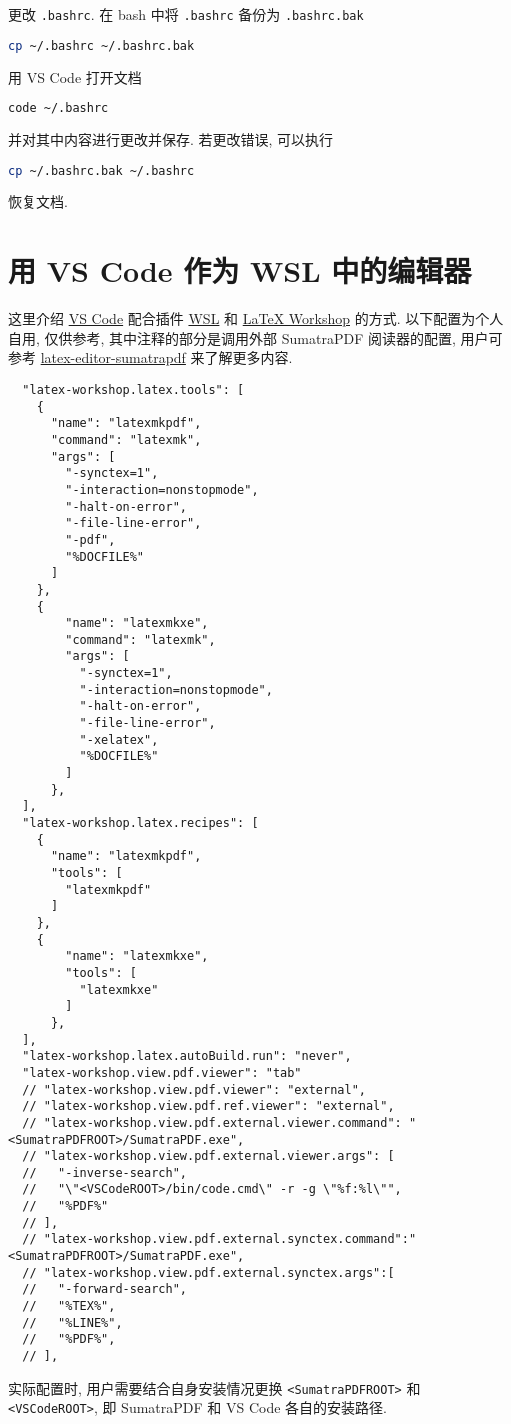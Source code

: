 更改 \texttt{.bashrc}.
在 \textsf{bash} 中将 \texttt{.bashrc} 备份为 \texttt{.bashrc.bak}
\begin{lstlisting}[language=bash]
  cp ~/.bashrc ~/.bashrc.bak
\end{lstlisting}
用 VS Code 打开文档
\begin{lstlisting}[language=bash]
  code ~/.bashrc
\end{lstlisting}
并对其中内容进行更改并保存.
若更改错误,
可以执行
\begin{lstlisting}[language=bash]
  cp ~/.bashrc.bak ~/.bashrc
\end{lstlisting}
恢复文档.

\section{用 VS Code 作为 WSL 中的编辑器}\label{sec:addition:wsl-editor}

这里介绍
\href{https://code.visualstudio.com/}{VS Code}
配合插件
\href{https://marketplace.visualstudio.com/items?itemName=ms-vscode-remote.remote-wsl}{WSL}
和
\href{https://marketplace.visualstudio.com/items?itemName=James-Yu.latex-workshop}{\LaTeX{} Workshop}
的方式.
以下配置为个人自用,
仅供参考,
其中注释的部分是调用外部 SumatraPDF 阅读器的配置,
用户可参考
\href{https://github.com/OsbertWang/latex-editor-sumatrapdf}{latex-editor-sumatrapdf}
来了解更多内容.

\begin{lstlisting}
  "latex-workshop.latex.tools": [
    {
      "name": "latexmkpdf",
      "command": "latexmk",
      "args": [
        "-synctex=1",
        "-interaction=nonstopmode",
        "-halt-on-error",
        "-file-line-error",
        "-pdf",
        "%DOCFILE%"
      ]
    },
    {
        "name": "latexmkxe",
        "command": "latexmk",
        "args": [
          "-synctex=1",
          "-interaction=nonstopmode",
          "-halt-on-error",
          "-file-line-error",
          "-xelatex",
          "%DOCFILE%"
        ]
      },
  ],
  "latex-workshop.latex.recipes": [
    {
      "name": "latexmkpdf",
      "tools": [
        "latexmkpdf"
      ]
    },
    {
        "name": "latexmkxe",
        "tools": [
          "latexmkxe"
        ]
      },
  ],
  "latex-workshop.latex.autoBuild.run": "never",
  "latex-workshop.view.pdf.viewer": "tab"
  // "latex-workshop.view.pdf.viewer": "external",
  // "latex-workshop.view.pdf.ref.viewer": "external",
  // "latex-workshop.view.pdf.external.viewer.command": "<SumatraPDFROOT>/SumatraPDF.exe",
  // "latex-workshop.view.pdf.external.viewer.args": [
  //   "-inverse-search",
  //   "\"<VSCodeROOT>/bin/code.cmd\" -r -g \"%f:%l\"",
  //   "%PDF%"
  // ],
  // "latex-workshop.view.pdf.external.synctex.command":"<SumatraPDFROOT>/SumatraPDF.exe",
  // "latex-workshop.view.pdf.external.synctex.args":[
  //   "-forward-search",
  //   "%TEX%",
  //   "%LINE%",
  //   "%PDF%",
  // ],
\end{lstlisting}

实际配置时,
用户需要结合自身安装情况更换 \texttt{<SumatraPDFROOT>} 和 \texttt{<VSCodeROOT>},
即 SumatraPDF 和 VS Code 各自的安装路径.